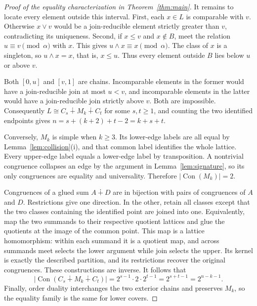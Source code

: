 \documentclass[11pt,a4paper]{article}
\numberwithin{equation}{section}
\theoremstyle{definition}
\theoremstyle{remark}
\DeclareMathOperator{\Con}{Con}
\newcommand{\glue}{\mathbin{\dotplus}}
\newcommand{\card}[1]{\lvert #1\rvert}
\begin{document}
\begin{proof}[Proof of the equality characterization in Theorem~\ref{thm:main}]
It remains to locate every element outside this interval.
First, each $x\in L$ is comparable with $v$. Otherwise $x\vee v$ would be a
join-reducible element strictly greater than $v$, contradicting its uniqueness.
Second, if $x\le v$ and $x\notin B$, meet the relation $u\equiv v\pmod\alpha$
with $x$. This gives $u\wedge x\equiv x\pmod\alpha$.
The class of $x$ is a singleton, so $u\wedge x=x$, that is, $x\le u$.
Thus every element outside $B$ lies below $u$ or above $v$.

Both $[0,u]$ and $[v,1]$ are chains. Incomparable elements in the former would
have a join-reducible join at most $u<v$, and incomparable elements in the latter
would have a join-reducible join strictly above $v$. Both are impossible.
Consequently $L\cong C_s\glue M_k\glue C_t$ for some $s,t\ge1$, and counting
the two identified endpoints gives $n=s+(k+2)+t-2=k+s+t$.

Conversely, $M_k$ is simple when $k\ge3$.
Its lower-edge labels are all equal by
Lemma~\ref{lem:collision}(i), and that common label identifies the whole lattice.
Every upper-edge label equals a lower-edge label by transposition.
A nontrivial congruence collapses an edge by the argument in
Lemma~\ref{lem:signature}, so its only congruences are equality and universality.
Therefore $\card{\Con(M_k)}=2$.

Congruences of a glued sum $A\glue D$ are in bijection with pairs of congruences
of $A$ and $D$. Restrictions give one direction. In the other, retain all classes
except that the two classes containing the identified point are joined into one.
Equivalently, map the two summands to their respective quotient lattices and
glue the quotients at the image of the common point. This map is a lattice
homomorphism: within each summand it is a quotient map, and across summands
meet selects the lower argument while join selects the upper. Its kernel is
exactly the described partition, and its restrictions recover the original
congruences. These constructions are inverse.
It follows that
\begin{equation}\label{eq:glued-count}
 \card{\Con(C_s\glue M_k\glue C_t)}
 =2^{s-1}\cdot2\cdot2^{t-1}
 =2^{s+t-1}=2^{n-k-1}.
\end{equation}
Finally, order duality interchanges the two exterior chains and preserves $M_k$,
so the equality family is the same for lower covers.
\end{proof}
\end{document}
